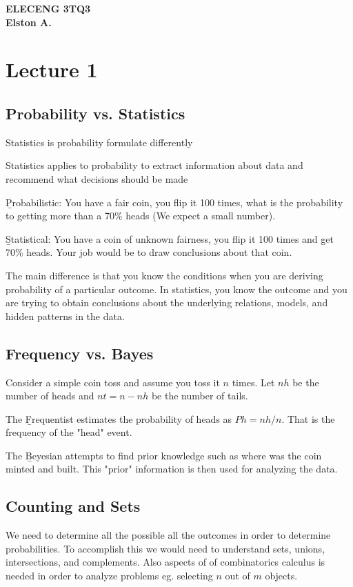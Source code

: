 \documentclass[12pt, titlepage, oneside]{article}
\begin{document}
	
	\textbf{ELECENG 3TQ3}\\
	\textbf{Elston A.}
	
	\section{Lecture 1}

\subsection{Probability vs. Statistics}

\items
\item Statistics is probability formulate differently
\item Statistics applies to probability to extract information about data and recommend what decisions should be made
\eitems

\b{Probabilistic: } You have a fair coin, you flip it 100 times, what is the probability to getting more than a 70\% heads (We expect a small number).

\b{Statistical: } You have a coin of unknown fairness, you flip it 100 times and get 70\% heads. Your job would be to draw conclusions about that coin. 

The main difference is that you know the conditions when you are deriving probability of a particular outcome. In statistics, you know the outcome and you are trying to obtain conclusions about the underlying relations, models, and hidden patterns in the data.

\subsection{Frequency vs. Bayes}

Consider a simple coin toss and assume you toss it $n$ times. Let $nh$ be the number of heads and $nt = n - nh$ be the number of tails.

The \b{Frequentist} estimates the probability of heads as $Ph = nh/n$. That is the frequency of the "head" event.

The \b{Beyesian} attempts to find prior knowledge such as where was the coin minted and built. This "prior" information is then used for analyzing the data.

\subsection{Counting and Sets}

We need to determine all the possible all the outcomes in order to determine probabilities. To accomplish this we would need to understand sets, unions, intersections, and complements. Also aspects of of combinatorics calculus is needed in order to analyze problems eg. selecting $n$ out of $m$ objects.
\end{document}

